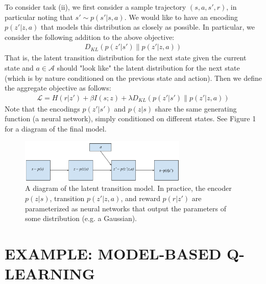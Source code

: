 \documentclass[letterpaper, 10 pt, conference]{ieeeconf}  %
\begin{document}
To consider task (ii), we first consider a sample trajectory $(s, a, s', r)$, in particular noting that $s' \sim p(s' | s,a)$. We would like to have an encoding $p(z'|z,a)$ that models this distribution as closely as possible. In particular, we consider the following addition to the above objective:
\begin{align*}
 D_{KL}(p(z'|s') \| p(z'|z,a))
\end{align*}
That is, the latent transition distribution for the next state given the current state and $a\in\mathcal{A}$ should "look like" the latent distribution for the next state (which is by nature conditioned on the previous state and action). Then we define the aggregate objective as follows:
\begin{align*}
\mathcal{L} = H(r|z') + \beta I(s;z) + \lambda D_{KL}(p(z'|s') \| p(z'|z,a))
\end{align*}
Note that the encodings $p(z'|s')$ and $p(z|s)$ share the same generating function (a neural network), simply conditioned on different states. See Figure 1 for a diagram of the final model.

\begin{figure}[t]
\includegraphics[width=8cm]{latentTransitionModel.pdf}
\caption{A diagram of the latent transition model. In practice, the encoder $p(z|s)$, transition $p(z'|z,a)$, and reward $p(r|z')$ are parameterized as neural networks that output the parameters of some distribution (e.g. a Gaussian).}
\centering
\end{figure}


\section{EXAMPLE: MODEL-BASED Q-LEARNING}
\end{document}
